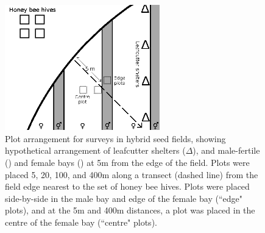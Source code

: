 \begin{figure}
    \centering
    \includegraphics[width=0.6\textwidth,keepaspectratio=true]{seedfieldPlots.png}
    \caption[Plot arrangement for surveys in hybrid seed fields]{Plot arrangement for surveys in hybrid seed fields, showing hypothetical arrangement of leafcutter shelters ($\Delta$), and male-fertile (\Hermaphrodite) and female bays (\Female) at 5m from the edge of the field. Plots were placed 5, 20, 100, and 400m along a transect (dashed line) from the field edge nearest to the set of honey bee hives. Plots were placed side-by-side in the male bay and edge of the female bay (``edge" plots), and at the 5m and 400m distances, a plot was placed in the centre of the female bay (``centre" plots).}
    \label{fig:seedfieldPlots}
\end{figure}

